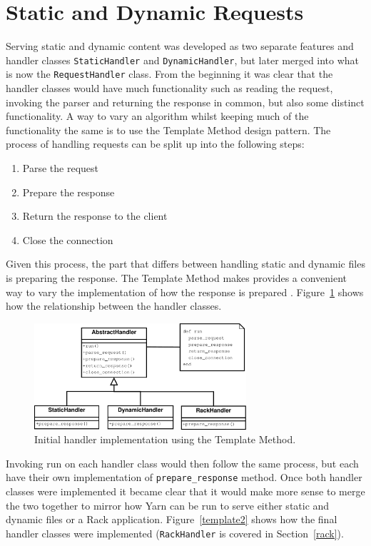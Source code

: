\section{Static and Dynamic Requests}
Serving static and dynamic content was developed as two separate features and
handler classes \texttt{StaticHandler} and \texttt{DynamicHandler}, but
later merged into what is now the \texttt{RequestHandler} class. From the
beginning it was clear that the handler classes would have much functionality
such as reading the request, invoking the parser and returning the response in
common, but also some distinct functionality. A way to vary an algorithm
whilst keeping much of the functionality the same is to use the Template
Method design pattern. The process of handling requests can be split up into
the following steps:

\begin{enumerate}
  \item Parse the request
  \item Prepare the response
  \item Return the response to the client
  \item Close the connection
\end{enumerate}

Given this process, the part that differs between handling static and dynamic
files is preparing the response. The Template Method makes provides a
convenient way to vary the implementation of how the response is prepared
\cite{design_patterns}.  Figure~\ref{template} shows how the relationship
between the handler classes.

\begin{figure}[htb]
  \centering
  \includegraphics[width=0.7\textwidth]{diagrams/handlers.pdf}
  \caption{Initial handler implementation using the Template Method.}
  \label{template}
\end{figure}

Invoking run on each handler class would then follow the same process, but
each have their own implementation of \texttt{prepare\_response} method. Once
both handler classes were implemented it became clear that it would make more
sense to merge the two together to mirror how Yarn can be run to serve either
static and dynamic files or a Rack application. Figure~\ref{template2} shows
how the final handler classes were implemented (\texttt{RackHandler} is
covered in Section~\ref{rack}).

